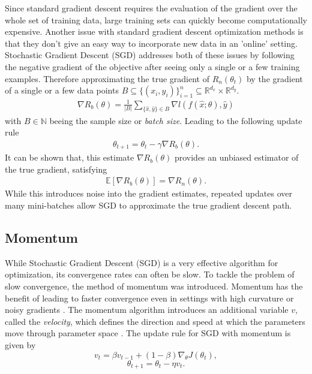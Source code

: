 
Since standard gradient descent requires the evaluation of the gradient over the whole set of training data, large training sets can quickly become 
computationally expensive.
Another issue with standard gradient descent optimization methods is that they don’t give an easy way to incorporate new data in an 'online' setting.
 Stochastic Gradient Descent (SGD) addresses both of these issues by following the negative gradient of the objective after seeing only a single or a few training examples.
 Therefore approximating the true gradient of $ R_n(\theta_t)$ by the gradient of a single or a few data points  \(B \subseteq  \{ (x_i, y_i) \}_{i=1}^{n} \subseteq \mathbb{R}^{d_x} \times \mathbb{R}^{d_y}\).
\begin{align}
    \nabla R_b(\theta) = \frac{1}{|B|} \sum_{\{\hat{x}, \hat{y}\} \in B} \nabla l(f(\hat{x}; \theta), \hat{y})
\end{align}
    with $B \in \mathbb{N}$ beeing the sample size or \emph{batch size}.
 Leading to the following update rule \cite{stanfordSGD}
 \begin{align}
    \theta_{t+1} = \theta_t - \gamma  {\nabla} R_b(\theta).
\end{align}
It can be shown that, this estimate $\nabla R_b(\theta)$ provides an unbiased estimator of the true gradient, satisfying
\begin{align}
\mathbb{E}[{\nabla} R_b(\theta)] = \nabla R_n(\theta).
\end{align}
While this introduces noise into the gradient estimates, repeated updates over many mini-batches allow SGD to approximate the true gradient descent path.
\subsection{Momentum}
\label{sec:momentum}


While Stochastic Gradient Descent (SGD) is a very effective algorithm for optimization,
its convergence rates can often be slow. To tackle the problem of slow convergence,
the method of momentum \cite{polyak1964some} was introduced. Momentum has the benefit of
leading to faster convergence even in settings with high curvature or noisy gradients \cite{Goodfellow-et-al-2016}.
The momentum algorithm introduces an additional variable $v$, called the \emph{velocity},
which defines the direction and speed at which the parameters move through parameter space \cite{Goodfellow-et-al-2016}.
The update rule for SGD with momentum is given by
\[    v_t = \beta v_{t-1} + (1 - \beta) \nabla_{\theta} J(\theta_t), \]
\[     \theta_{t+1} = \theta_t - \eta v_t .\]

